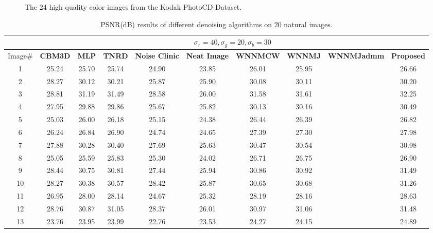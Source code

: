 \documentclass[10pt,twocolumn,letterpaper]{article}
\begin{document}
\begin{figure}
{\begin{minipage}{0.075\textwidth}
\end{minipage}
}\vspace{-1mm}
\caption{The 24 high quality color images from the Kodak PhotoCD Dataset.}
\label{fig3}
\vspace{-2mm}
\end{figure}


\begin{table}
\caption{PSNR(dB) results of different denoising algorithms on 20 natural images.}
\label{taba}
\begin{center}
\renewcommand\arraystretch{1.0}
\scriptsize
\begin{tabular}{|c||c|c|c|c|c|c|c|c|c|}
\hline
&\multicolumn{9}{c|}{ $\sigma_{r} = 40, \sigma_{g} = 20, \sigma_{b} = 30$}
\\
\hline
\hline
Image\#
&
\textbf{CBM3D}
&
\textbf{MLP}
&
\textbf{TNRD}
&
\textbf{Noise Clinic}
&
\textbf{Neat Image}
&
\textbf{WNNMCW}
&
\textbf{WNNMJ}
&
\textbf{WNNMJadmm}
&
\textbf{Proposed}
\\
\hline
1& 25.24 & 25.70 & 25.74 & 24.90 & 23.85 & 26.01 & 25.95 &  & 26.66
\\
\hline
2& 28.27 & 30.12 & 30.21 & 25.87 & 25.90 & 30.08 & 30.11 &  & 30.20 
\\
\hline
3 & 28.81 & 31.19 & 31.49 & 28.58 & 26.00 & 31.58 & 31.61 &  & 32.25  
\\
\hline 
4 & 27.95 & 29.88 & 29.86 & 25.67 & 25.82 & 30.13 & 30.16 &  & 30.49 
\\
\hline
5 & 25.03 & 26.00 & 26.18 & 25.15 & 24.38 & 26.44 & 26.39 &  & 26.82
\\
\hline
6 & 26.24 & 26.84 & 26.90 & 24.74 & 24.65 & 27.39 & 27.30 &  & 27.98 
\\
\hline
7 & 27.88 & 30.28 & 30.40 & 27.69 & 25.63 & 30.47 & 30.54 &  & 30.98 
\\
\hline
8 & 25.05 & 25.59 & 25.83 & 25.30 & 24.02 & 26.71 & 26.75 &  & 26.90
\\
\hline
9 & 28.44 & 30.75 & 30.81 & 27.44 & 25.94 & 30.86 & 30.92 &  & 31.49
\\
\hline
10 & 28.27 & 30.38 & 30.57 & 28.42 & 25.87 & 30.65 & 30.68 &  & 31.26
\\
\hline
11 & 26.95 & 28.00 & 28.14 & 24.67 & 25.32 & 28.19 & 28.16 &  & 28.63
\\
\hline
12 & 28.76 & 30.87 & 31.05 & 28.37 & 26.01 & 30.97 & 31.06 &  & 31.48
\\
\hline
13 & 23.76 & 23.95 & 23.99 & 22.76 & 23.53 & 24.27 & 24.15 &  & 24.89
\\
\hline

\end{tabular}
\end{center}
\end{table}
\end{document}
